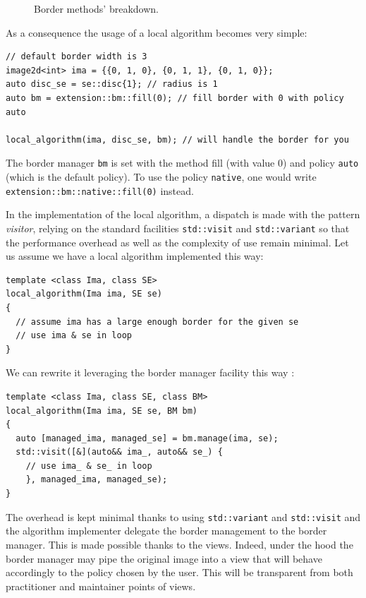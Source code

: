 \begin{figure}[htbp]
  \centering
  \hfil
  \hfil
  \hfil
  \hfil
  \hfil

  \caption{Border methods' breakdown.}
  \label{fig:border.all}
\end{figure}

As a consequence the usage of a local algorithm becomes very simple:

\begin{verbatim}
// default border width is 3
image2d<int> ima = {{0, 1, 0}, {0, 1, 1}, {0, 1, 0}};
auto disc_se = se::disc{1}; // radius is 1
auto bm = extension::bm::fill(0); // fill border with 0 with policy auto

local_algorithm(ima, disc_se, bm); // will handle the border for you
\end{verbatim}

The border manager \texttt{bm} is set with the method fill (with value 0) and policy \texttt{auto} (which is the default
policy). To use the policy \texttt{native}, one would write \texttt{extension::bm::native::fill(0)} instead.

In the implementation of the local algorithm, a dispatch is made with the pattern \emph{visitor}, relying on the
standard facilities \texttt{std::visit} and \texttt{std::variant} so that the performance overhead as well as the
complexity of use remain minimal. Let us assume we have a local algorithm implemented this way:
\begin{verbatim}
template <class Ima, class SE>
local_algorithm(Ima ima, SE se)
{
  // assume ima has a large enough border for the given se
  // use ima & se in loop
}
\end{verbatim}
We can rewrite it leveraging the border manager facility this way :
\begin{verbatim}
template <class Ima, class SE, class BM>
local_algorithm(Ima ima, SE se, BM bm)
{
  auto [managed_ima, managed_se] = bm.manage(ima, se);
  std::visit([&](auto&& ima_, auto&& se_) { 
    // use ima_ & se_ in loop
    }, managed_ima, managed_se);
}
\end{verbatim}
The overhead is kept minimal thanks to using \texttt{std::variant} and \texttt{std::visit} and the algorithm implementer
delegate the border management to the border manager. This is made possible thanks to the views. Indeed, under the hood
the border manager may pipe the original image into a view that will behave accordingly to the policy chosen by the
user. This will be transparent from both practitioner and maintainer points of views.


